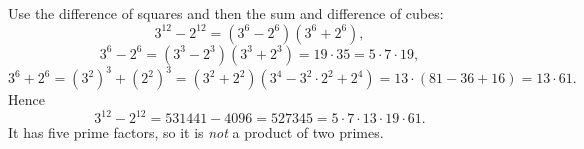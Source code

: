Use the difference of squares and then the sum and difference of cubes:
\[
3^{12}-2^{12}=\left(3^6-2^6\right)\left(3^6+2^6\right),
\]
\[
3^6-2^6=\left(3^3-2^3\right)\left(3^3+2^3\right)=19\cdot35=5\cdot7\cdot19,
\]
\[
3^6+2^6=\left(3^2\right)^3+\left(2^2\right)^3=\left(3^2+2^2\right)\left(3^4-3^2\cdot2^2+2^4\right)=13\cdot(81-36+16)=13\cdot61 .
\]
Hence
\[
3^{12}-2^{12}=531441-4096=527345=\boxed{5\cdot7\cdot13\cdot19\cdot61}.
\]
It has five prime factors, so it is \emph{not} a product of two primes.
